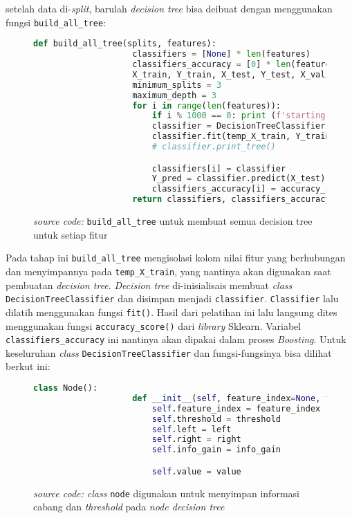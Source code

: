 		setelah data di-\textit{split}, barulah \emph{decision tree} bisa deibuat dengan menggunakan 
		fungsi \texttt{build\_all\_tree}:

		\begin{figure}[H]
			\begin{lstlisting}[language=Python, basicstyle=\tiny]
				def build_all_tree(splits, features):
					classifiers = [None] * len(features)
					classifiers_accuracy = [0] * len(features)
					X_train, Y_train, X_test, Y_test, X_valid, Y_valid = splits
					minimum_splits = 3
					maximum_depth = 3
					for i in range(len(features)):
						if i % 1000 == 0: print (f'starting tree {i}')
						classifier = DecisionTreeClassifier(minimum_splits, maximum_depth)
						classifier.fit(temp_X_train, Y_train)
						# classifier.print_tree()

						classifiers[i] = classifier
						Y_pred = classifier.predict(X_test)
						classifiers_accuracy[i] = accuracy_score(Y_test, Y_pred)
					return classifiers, classifiers_accuracy
			\end{lstlisting}
			\caption{\emph{source code:} \texttt{build\_all\_tree} untuk membuat semua decision tree untuk setiap fitur}
			\label{code: make all decision tree}
		\end{figure}

		Pada tahap ini \texttt{build\_all\_tree} mengisolasi kolom nilai fitur yang berhubungan 
		dan menyimpannya pada \texttt{temp\_X\_train}, yang nantinya akan digunakan saat pembuatan 
		\emph{decision tree}. \emph{Decision tree} di-inisialisais membuat \textit{class}
		\texttt{DecisionTreeClassifier} dan disimpan menjadi \texttt{classifier}. 
		\texttt{Classifier} lalu dilatih menggunakan fungsi \texttt{fit()}. Hasil dari pelatihan ini lalu langsung dites menggunakan 
		fungsi \texttt{accuracy\_score()} dari \textit{library} Sklearn. Variabel \texttt{classifiers\_accuracy} ini nantinya 
		akan dipakai dalam proses \emph{Boosting}. Untuk keseluruhan \textit{class} \texttt{DecisionTreeClassifier} 
		dan fungsi-fungsinya bisa dilihat berkut ini:

		\begin{figure}[H]
			\begin{lstlisting}[language=Python, basicstyle=\tiny]
				class Node():
					def __init__(self, feature_index=None, threshold=None, left=None, right=None, info_gain=None, value=None):
						self.feature_index = feature_index
						self.threshold = threshold
						self.left = left
						self.right = right
						self.info_gain = info_gain

						self.value = value
			\end{lstlisting}
			\caption{\emph{source code: class} \texttt{node} digunakan untuk menyimpan informasi cabang dan
			\textit{threshold} pada \emph{node decision tree}}
			\label{code: node class}
		\end{figure}	

